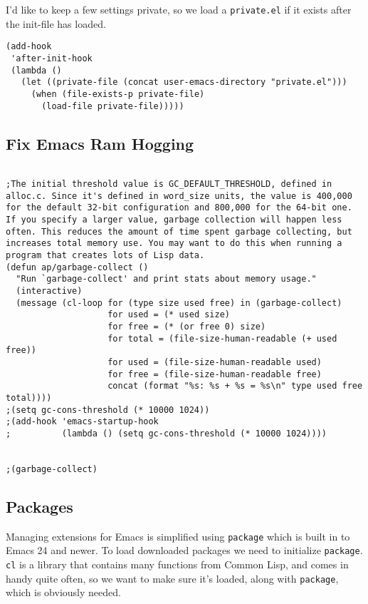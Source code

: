 \documentclass[11pt]{article}
\begin{document}
I'd like to keep a few settings private, so we load a \texttt{private.el} if it
exists after the init-file has loaded.

\begin{verbatim}
(add-hook
 'after-init-hook
 (lambda ()
   (let ((private-file (concat user-emacs-directory "private.el")))
     (when (file-exists-p private-file)
       (load-file private-file)))))
\end{verbatim}




\subsection{Fix Emacs Ram Hogging}
\label{sec:orgfa712b7}


\begin{verbatim}

;The initial threshold value is GC_DEFAULT_THRESHOLD, defined in alloc.c. Since it's defined in word_size units, the value is 400,000 for the default 32-bit configuration and 800,000 for the 64-bit one. If you specify a larger value, garbage collection will happen less often. This reduces the amount of time spent garbage collecting, but increases total memory use. You may want to do this when running a program that creates lots of Lisp data. 
(defun ap/garbage-collect ()
  "Run `garbage-collect' and print stats about memory usage."
  (interactive)
  (message (cl-loop for (type size used free) in (garbage-collect)
                    for used = (* used size)
                    for free = (* (or free 0) size)
                    for total = (file-size-human-readable (+ used free))
                    for used = (file-size-human-readable used)
                    for free = (file-size-human-readable free)
                    concat (format "%s: %s + %s = %s\n" type used free total))))
;(setq gc-cons-threshold (* 10000 1024))
;(add-hook 'emacs-startup-hook
;          (lambda () (setq gc-cons-threshold (* 10000 1024))))


;(garbage-collect)
\end{verbatim}
\subsection{Packages}
\label{sec:org5815cd2}
Managing extensions for Emacs is simplified using \texttt{package} which is
built in to Emacs 24 and newer. To load downloaded packages we need to
initialize \texttt{package}. \texttt{cl} is a library that contains many functions from
Common Lisp, and comes in handy quite often, so we want to make sure it's
loaded, along with \texttt{package}, which is obviously needed.
\end{document}
